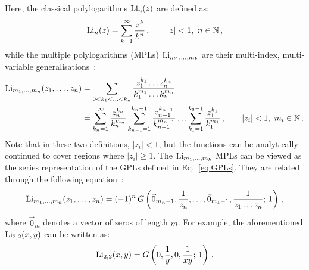 \documentclass[main.tex]{subfiles}
\begin{document}
Here, the classical polylogarithms $\text{Li}_n(z)$ are defined as:
\begin{equation} \label{eq:Lidefinition}
    \text{Li}_n(z) = \sum_{k=1}^\infty \frac{z^k}{k^n}\,, \qquad |z|<1,\,\, n \in \mathbb{N}\,,
\end{equation}
while the multiple polylogarithms (MPLs) $\text{Li}_{m_1, \ldots, m_k}$ are their multi-index, multi-variable generalisations~\cite{2011arXiv1105.2076G, Duhr:2019tlz}:
\begin{subequations}
\begin{align} \label{eq:multiLidefinition}
    \text{Li}_{m_1, \ldots, m_n}(z_1, \ldots, z_n) &= \sum_{0<k_1<\ldots<k_n} \frac{z_1^{k_1} \ldots z_n^{k_n}}{k_1^{m_1} \ldots k_n^{m_n}} \\
    &= \sum_{k_n=1}^\infty \frac{z_n^{k_n}}{k_n^{m_n}} \sum_{k_{n-1}=1}^{k_n-1} \frac{z_{n-1}^{k_{n-1}}}{k_{n-1}^{m_{n-1}}}\ldots \sum_{k_1=1}^{k_2-1} \frac{z_1^{k_1}}{k_1^{m_1}}\,, \qquad |z_i|<1, \,\, m_i \in \mathbb{N} \,. \label{eq:multiLidefinition2}
\end{align}
\end{subequations}
Note that in these two definitions, $|z_i|<1$, but the functions can be analytically continued to cover regions where $|z_i| \ge 1$. The $\text{Li}_{m_1, \ldots, m_k}$ MPLs can be viewed as the series representation of the GPLs defined in Eq.~\ref{eq:GPLs}. They are related through the following equation~\cite{Duhr:2011zq}:
\begin{equation} \label{eq:LiToG}
    \text{Li}_{m_1, \ldots, m_n}(z_1, \ldots, z_n) = (-1)^n\,G\left(\vec{0}_{m_n-1}, \frac{1}{z_n}, \ldots, \vec{0}_{m_1-1}, \frac{1}{z_1\ldots z_n}; \,1 \right)\,,
\end{equation}
where $\vec{0}_m$ denotes a vector of zeros of length $m$. For example, the aforementioned $\text{Li}_{2,2}(x, y)$ can be written as:%
\begin{equation}
     \text{Li}_{2,2}(x, y) = G\left(0, \frac{1}{y}, 0, \frac{1}{xy};\,1 \right)\,.
\end{equation}
\end{document}
